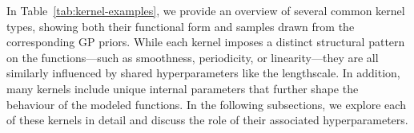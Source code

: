 \documentclass{article}
\begin{document}
\noindent
In Table~\ref{tab:kernel-examples}, we provide an overview of several common kernel types, 
showing both their functional form and samples drawn from the corresponding GP priors. 
While each kernel imposes a distinct structural pattern on the functions—such as smoothness, periodicity, or linearity—they are all similarly influenced by shared hyperparameters like the lengthscale. 
In addition, many kernels include unique internal parameters that further shape the behaviour of the modeled functions. 
In the following subsections, we explore each of these kernels in detail and discuss the role of their associated hyperparameters.


\begin{table}[H]
    \centering
    \renewcommand{\arraystretch}{4} %
    \setlength{\tabcolsep}{2pt} %
    \small %


\end{table}
\end{document}
